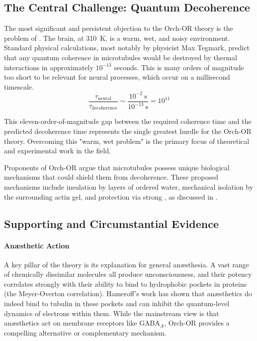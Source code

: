 \subsection{The Central Challenge: Quantum Decoherence}

The most significant and persistent objection to the Orch-OR theory is the problem of . The brain, at 310~K, is a warm, wet, and noisy environment. Standard physical calculations, most notably by physicist Max Tegmark, predict that any quantum coherence in microtubules would be destroyed by thermal interactions in approximately \(10^{-13}\) seconds. This is many orders of magnitude too short to be relevant for neural processes, which occur on a millisecond timescale.
\begin{equation}
\label{eq:coherence-gap}
\frac{\tau_{\text{neural}}}{\tau_{\text{decoherence}}} \sim \frac{10^{-2}~\text{s}}{10^{-13}~\text{s}} = 10^{11}
\end{equation}

\begin{warningbox}
    This eleven-order-of-magnitude gap between the required coherence time and the predicted decoherence time represents the single greatest hurdle for the Orch-OR theory. Overcoming this "warm, wet problem" is the primary focus of theoretical and experimental work in the field.
\end{warningbox}

Proponents of Orch-OR argue that microtubules possess unique biological mechanisms that could shield them from decoherence. These proposed mechanisms include insulation by layers of ordered water, mechanical isolation by the surrounding actin gel, and protection via strong , as discussed in .

\subsection{Supporting and Circumstantial Evidence}

\paragraph{Anæsthetic Action}
A key pillar of the theory is its explanation for general anæsthesia. A vast range of chemically dissimilar molecules all produce unconsciousness, and their potency correlates strongly with their ability to bind to hydrophobic pockets in proteins (the Meyer-Overton correlation). Hameroff's work has shown that anæsthetics do indeed bind to tubulin in these pockets and can inhibit the quantum-level dynamics of electrons within them. While the mainstream view is that anæsthetics act on membrane receptors like GABA\(_A\), Orch-OR provides a compelling alternative or complementary mechanism.

